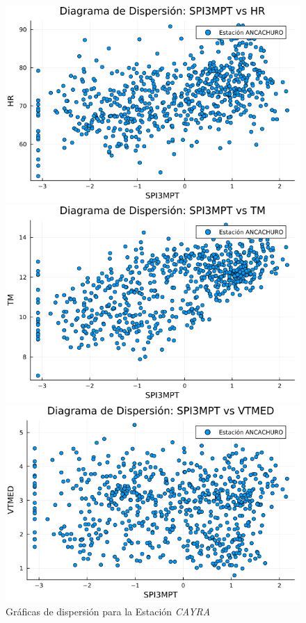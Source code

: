 \begin{figure}[htbp]
\centering
\caption{Gráficas de dispersión para la Estación \textit{CAYRA}}
\begin{minipage}{0.32\textwidth}
    \centering
    \includegraphics[width=\linewidth]{Capitulos/Scaterplot/ANCACHURO_SPI3MPT_vs_HR.png}
\end{minipage}\hfill
\begin{minipage}{0.32\textwidth}
    \centering
    \includegraphics[width=\linewidth]{Capitulos/Scaterplot/ANCACHURO_SPI3MPT_vs_TM.png}
\end{minipage}\hfill
\begin{minipage}{0.32\textwidth}
    \centering
    \includegraphics[width=\linewidth]{Capitulos/Scaterplot/ANCACHURO_SPI3MPT_vs_VTMED.png}

\end{minipage}
\end{figure}
